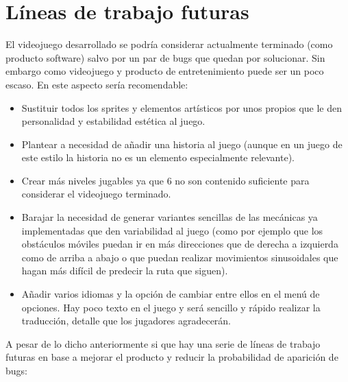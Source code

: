 \section{Líneas de trabajo futuras}
El videojuego desarrollado se podría considerar actualmente terminado (como producto software) salvo por un par de bugs que quedan por solucionar. Sin embargo como videojuego y producto de entretenimiento puede ser un poco escaso.
En este aspecto sería recomendable:
\begin{itemize}
\item
Sustituir todos los sprites y elementos artísticos por unos propios que le den personalidad y estabilidad estética al juego.
\item
Plantear a necesidad de añadir una historia al juego (aunque en un juego de este estilo la historia no es un elemento especialmente relevante).
\item
Crear más niveles jugables ya que 6 no son contenido suficiente para considerar el videojuego terminado.
\item
Barajar la necesidad de generar variantes sencillas de las mecánicas ya implementadas que den variabilidad al juego (como por ejemplo que los obstáculos móviles puedan ir en más direcciones que de derecha a izquierda como de arriba a abajo o que puedan realizar movimientos sinusoidales que hagan más difícil de predecir la ruta que siguen).
\item
Añadir varios idiomas y la opción de cambiar entre ellos en el menú de opciones. Hay poco texto en el juego y será sencillo y rápido realizar la traducción, detalle que los jugadores agradecerán.
\end{itemize}

A pesar de lo dicho anteriormente si que hay una serie de líneas de trabajo futuras en base a mejorar el producto y reducir la probabilidad de aparición de bugs:

